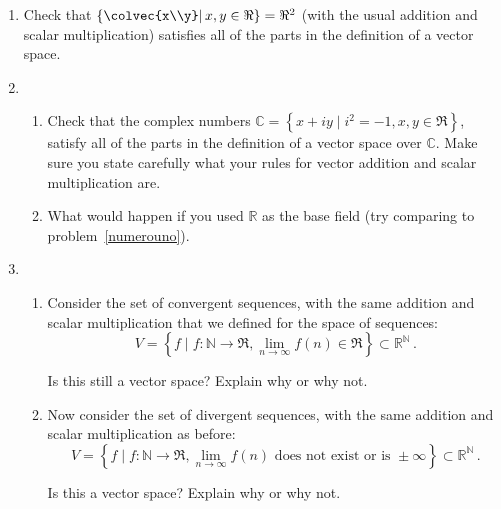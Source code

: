 


\begin{enumerate}
\item \label{numerouno} Check that $\left\{\colvec{x\\y} \middle|\,  x,y \in \Re \right\} = \Re^2$ (with the usual addition and scalar multiplication) satisfies all of the parts in the definition of a vector space.

\vspace{5mm}

\item 
\begin{enumerate}
\item Check that the complex numbers $\mathbb{C}= \left\{x+iy \mid i^2=-1, x,y\in \Re \right\}$, satisfy all of the parts in the definition of a vector space over  ${\mathbb C}$.
Make sure you state carefully what your rules for vector addition and scalar multiplication are. \\
\item What would happen if you used ${\mathbb R}$ as the base field (try comparing to problem~\ref{numerouno}).
\end{enumerate}
\vspace{5mm}

\item \begin{enumerate}
\item Consider the set of convergent sequences, with the same addition and scalar multiplication that we defined for the space of sequences: 
\[V = \left\{f \mid f \colon \mathbb{N} \rightarrow \Re, \lim_{n \rightarrow \infty} f(n) \in \Re \right\}\subset {\mathbb R}^{\mathbb N}\, .\]

Is this still a vector space?  Explain why or why not.

\item Now consider the set of divergent sequences, with the same addition and scalar multiplication as before:
\[V = \left\{f \mid f \colon \mathbb{N} \rightarrow \Re, \lim_{n \rightarrow \infty} f (n)\text{ does not exist or is }\pm \infty \right\}\subset {\mathbb R}^{\mathbb N}\, .\]

Is this a vector space? Explain why or why not.
\end{enumerate}




\end{enumerate}
